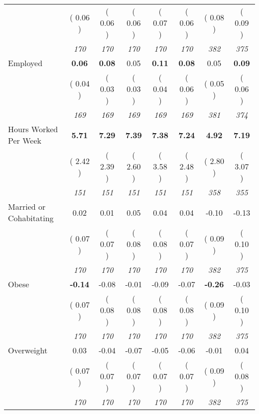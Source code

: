 \begin{tabular}{l c c c c c c c}
& (     0.06 ) & (     0.06 ) & (     0.06 ) & (     0.07 ) & (     0.06 ) & (     0.08 ) & (     0.09 ) \\
& \textit{ 170 } & \textit{ 170 } & \textit{ 170 } & \textit{ 170 } & \textit{ 170 } & \textit{ 382 } & \textit{ 375 } \\
Employed & \textbf{      0.06 } & \textbf{      0.08 } &      0.05 & \textbf{     0.11} & \textbf{     0.08} &      0.05 & \textbf{      0.09 } \\
& (     0.04 ) & (     0.03 ) & (     0.03 ) & (     0.04 ) & (     0.06 ) & (     0.05 ) & (     0.06 ) \\
& \textit{ 169 } & \textit{ 169 } & \textit{ 169 } & \textit{ 169 } & \textit{ 169 } & \textit{ 381 } & \textit{ 374 } \\
Hours Worked Per Week & \textbf{      5.71 } & \textbf{      7.29 } & \textbf{      7.39 } & \textbf{     7.38} & \textbf{     7.24} & \textbf{      4.92 } & \textbf{      7.19 } \\
& (     2.42 ) & (     2.39 ) & (     2.60 ) & (     3.58 ) & (     2.48 ) & (     2.80 ) & (     3.07 ) \\
& \textit{ 151 } & \textit{ 151 } & \textit{ 151 } & \textit{ 151 } & \textit{ 151 } & \textit{ 358 } & \textit{ 355 } \\
Married or Cohabitating &      0.02 &      0.01 &      0.05 &      0.04 &      0.04 &     -0.10 &     -0.13 \\
& (     0.07 ) & (     0.07 ) & (     0.08 ) & (     0.08 ) & (     0.07 ) & (     0.09 ) & (     0.10 ) \\
& \textit{ 170 } & \textit{ 170 } & \textit{ 170 } & \textit{ 170 } & \textit{ 170 } & \textit{ 382 } & \textit{ 375 } \\
Obese & \textbf{     -0.14 } &     -0.08 &     -0.01 &     -0.09 &     -0.07 & \textbf{     -0.26 } &     -0.03 \\
& (     0.07 ) & (     0.08 ) & (     0.08 ) & (     0.08 ) & (     0.08 ) & (     0.09 ) & (     0.10 ) \\
& \textit{ 170 } & \textit{ 170 } & \textit{ 170 } & \textit{ 170 } & \textit{ 170 } & \textit{ 382 } & \textit{ 375 } \\
Overweight &      0.03 &     -0.04 &     -0.07 &     -0.05 &     -0.06 &     -0.01 &      0.04 \\
& (     0.07 ) & (     0.07 ) & (     0.07 ) & (     0.07 ) & (     0.07 ) & (     0.09 ) & (     0.08 ) \\
& \textit{ 170 } & \textit{ 170 } & \textit{ 170 } & \textit{ 170 } & \textit{ 170 } & \textit{ 382 } & \textit{ 375 } \\

\end{tabular}
